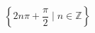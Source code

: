 \documentclass{article}
\begin{document}
$$\left\{2 n \pi + \frac{\pi}{2}\; |\; n \in \mathbb{Z}\right\}$$
\end{document}
